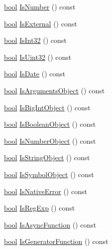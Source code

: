 \begin{DoxyCompactItemize}
\item 
\mbox{\hyperlink{classbool}{bool}} \mbox{\hyperlink{classv8_1_1Value_a6ef42a28c0bc70022acb7e308bda4e19}{Is\+Number}} () const
\item 
\mbox{\hyperlink{classbool}{bool}} \mbox{\hyperlink{classv8_1_1Value_a908070323b8cd593127141a22b79e39d}{Is\+External}} () const
\item 
\mbox{\hyperlink{classbool}{bool}} \mbox{\hyperlink{classv8_1_1Value_ad5d58df1d978b4d9875eb97b3bebfc29}{Is\+Int32}} () const
\item 
\mbox{\hyperlink{classbool}{bool}} \mbox{\hyperlink{classv8_1_1Value_ae30d50fb96b03239bc90ceb07b6e46fc}{Is\+Uint32}} () const
\item 
\mbox{\hyperlink{classbool}{bool}} \mbox{\hyperlink{classv8_1_1Value_aa94f94744aed4d5e731eacf52c8b4801}{Is\+Date}} () const
\item 
\mbox{\hyperlink{classbool}{bool}} \mbox{\hyperlink{classv8_1_1Value_addd71e0247ca7e8055dafdf196542b0b}{Is\+Arguments\+Object}} () const
\item 
\mbox{\hyperlink{classbool}{bool}} \mbox{\hyperlink{classv8_1_1Value_a33927dad98e669f53f2fed83d68a24a6}{Is\+Big\+Int\+Object}} () const
\item 
\mbox{\hyperlink{classbool}{bool}} \mbox{\hyperlink{classv8_1_1Value_a4cc64a2761fa8ed852007a2c35ecde8a}{Is\+Boolean\+Object}} () const
\item 
\mbox{\hyperlink{classbool}{bool}} \mbox{\hyperlink{classv8_1_1Value_a497018ef8c5ed946e1c0c30554bad3f8}{Is\+Number\+Object}} () const
\item 
\mbox{\hyperlink{classbool}{bool}} \mbox{\hyperlink{classv8_1_1Value_a32054145eadf3b1a3f900dcd52110e2b}{Is\+String\+Object}} () const
\item 
\mbox{\hyperlink{classbool}{bool}} \mbox{\hyperlink{classv8_1_1Value_a1d5507f09734f8062a0d0a9a78496b2a}{Is\+Symbol\+Object}} () const
\item 
\mbox{\hyperlink{classbool}{bool}} \mbox{\hyperlink{classv8_1_1Value_a7dc01ab1db65640f774366e8ecab91df}{Is\+Native\+Error}} () const
\item 
\mbox{\hyperlink{classbool}{bool}} \mbox{\hyperlink{classv8_1_1Value_a010aa78e7cc8e1dbb878479e534992b3}{Is\+Reg\+Exp}} () const
\item 
\mbox{\hyperlink{classbool}{bool}} \mbox{\hyperlink{classv8_1_1Value_ade5685814ab387c1772e2d5dbd000735}{Is\+Async\+Function}} () const
\item 
\mbox{\hyperlink{classbool}{bool}} \mbox{\hyperlink{classv8_1_1Value_ac0a7fcb3b244a921e5574e6f34fa9b07}{Is\+Generator\+Function}} () const

\end{DoxyCompactItemize}
